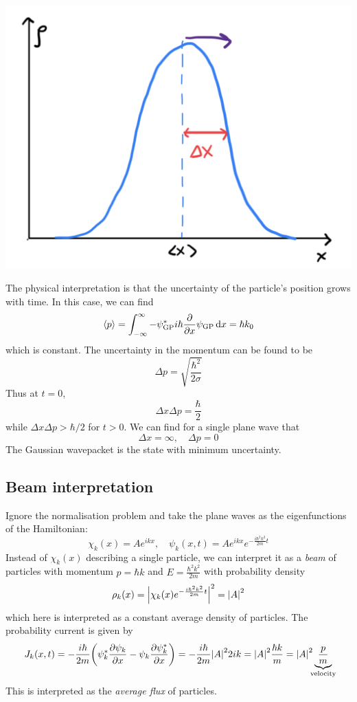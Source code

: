 \documentclass[a4paper]{article}
\begin{document}
\begin{center}
    \includegraphics[scale=0.15]{qm9.png}
\end{center}

The physical interpretation is that the uncertainty of the particle's position grows with time.
In this case, we can find
\[
	\left\langle{p}\right\rangle = \int_{-\infty}^\infty -\psi_{\text{GP}}^* i \hbar \pdv{x} \psi_{\text{GP}} \,\mathrm{d}{x} = \hbar k_0
\]
which is constant.
The uncertainty in the momentum can be found to be
\[
	\Delta p=\sqrt{\frac{\hbar^2}{2 \sigma}}
\]
Thus at $t=0$, 
\[
	\Delta x \Delta p = \frac{\hbar}{2}
\]
while $\Delta x \Delta p>\hbar / 2$ for $t>0$.
We can find for a single plane wave that
\[
	\Delta x = \infty,\quad \Delta p = 0
\]
The Gaussian wavepacket is the state with minimum uncertainty.

\subsection{Beam interpretation}

Ignore the normalisation problem and take the plane waves as the eigenfunctions of the Hamiltonian:
\[
	\chi_k(x) = Ae^{ikx},\quad \psi_k(x,t) = Ae^{ikx}e^{-\frac{i \hbar^2 k^2}{2m} t}
\]
Instead of \( \chi_k(x) \) describing a single particle, we can interpret it as a \textit{beam} of particles with momentum \( p = \hbar k \) and \( E = \frac{\hbar^2 k^2}{2m} \) with probability density
\[
	\rho_k(x) = \abs{\chi_k(x) e^{-\frac{i\hbar^2 k^2}{2m}t}}^2 = \abs{A}^2
\]
which here is interpreted as a constant average density of particles.
The probability current is given by
\[
	J_k(x,t) = - \frac{i\hbar}{2m} \qty(\psi^*_k \pdv{\psi_k}{x} - \psi_k \pdv{\psi_k^*}{x}) = -\frac{i\hbar}{2m} \abs{A}^2 2ik = \abs{A}^2 \frac{\hbar k}{m} = \abs{A}^2 \underbrace{\frac{p}{m}}_{\mathclap{\text{velocity}}}
\]
This is interpreted as the \textit{average flux} of particles.
\end{document}
